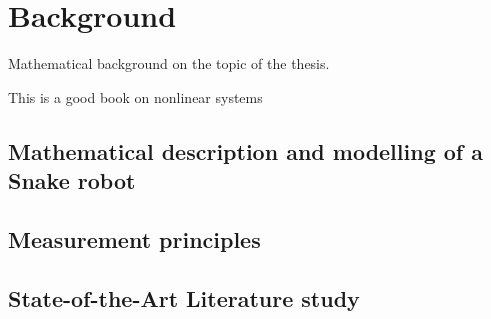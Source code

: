 

\chapter{Background}
Mathematical background on the topic of the thesis.

This is a good book on nonlinear systems \cite{ulin}

\section{Mathematical description and modelling of a Snake robot}



\section{Measurement principles}



\section{State-of-the-Art Literature study}




